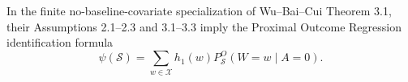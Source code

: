 In the finite no-baseline-covariate specialization of Wu--Bai--Cui Theorem 3.1, their Assumptions 2.1--2.3 and 3.1--3.3 imply the Proximal Outcome Regression identification formula
\[
 \psi(\mathcal S)=\sum_{w\in\mathcal X}h_1(w)P_{\mathcal S}^O(W=w\mid A=0).
\]